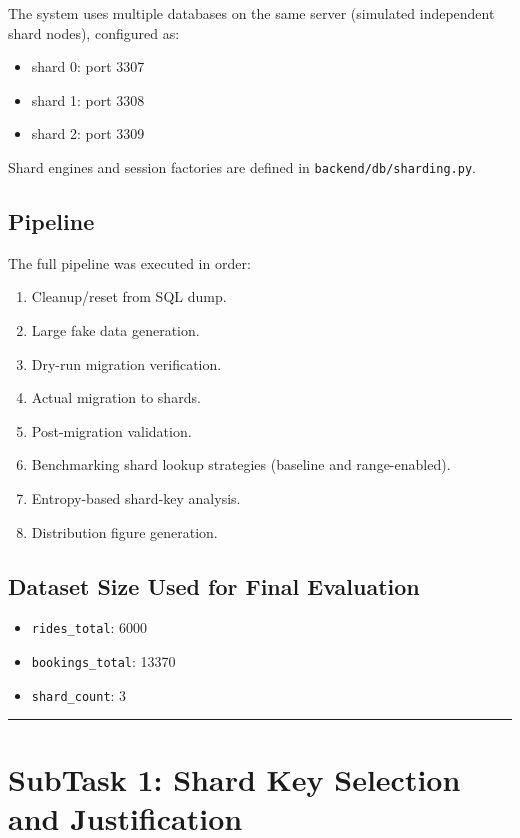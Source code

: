 \documentclass[12pt]{article}
\begin{document}
The system uses multiple databases on the same server (simulated independent shard nodes), configured as:
\begin{itemize}
    \item shard 0: port 3307
    \item shard 1: port 3308
    \item shard 2: port 3309
\end{itemize}

Shard engines and session factories are defined in \texttt{backend/db/sharding.py}.

\subsection{Pipeline}

The full pipeline was executed in order:
\begin{enumerate}
    \item Cleanup/reset from SQL dump.
    \item Large fake data generation.
    \item Dry-run migration verification.
    \item Actual migration to shards.
    \item Post-migration validation.
    \item Benchmarking shard lookup strategies (baseline and range-enabled).
    \item Entropy-based shard-key analysis.
    \item Distribution figure generation.
\end{enumerate}

\subsection{Dataset Size Used for Final Evaluation}

\begin{itemize}
    \item \texttt{rides\_total}: 6000
    \item \texttt{bookings\_total}: 13370
    \item \texttt{shard\_count}: 3
\end{itemize}

\hrule
\vspace{0.75em}

\section{SubTask 1: Shard Key Selection and Justification}
\end{document}
